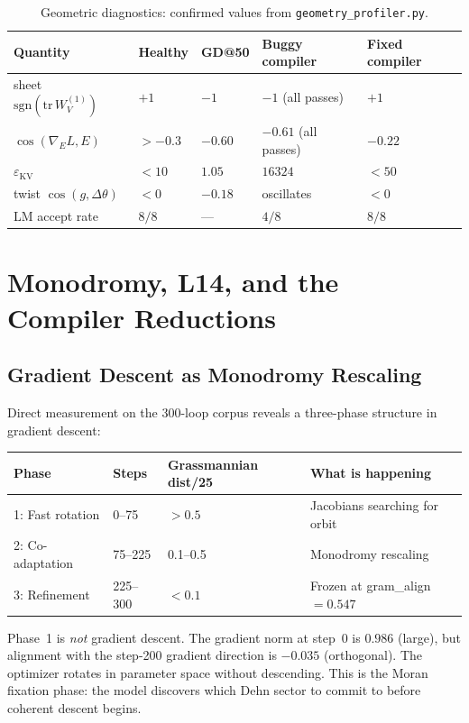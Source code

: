 \documentclass[11pt]{amsart}
\begin{document}
\begin{table}[htbp]
\centering\small
\caption{Geometric diagnostics: confirmed values from
  \texttt{geometry\_profiler.py}.}
\label{tab:debug}
\begin{tabular}{lllll}
\toprule
\textbf{Quantity} & \textbf{Healthy} & \textbf{GD@50}
  & \textbf{Buggy compiler} & \textbf{Fixed compiler} \\
\midrule
sheet $\mathrm{sgn}(\mathrm{tr}\,W_V^{(1)})$
  & $+1$ & $-1$ & $-1$ (all passes) & $+1$ \\
$\cos(\nabla_E L, E)$
  & $>-0.3$ & $-0.60$ & $-0.61$ (all passes) & $-0.22$ \\
$\varepsilon_\mathrm{KV}$
  & $<10$ & $1.05$ & $16324$ & $<50$ \\
twist $\cos(g,\Delta\theta)$
  & $<0$ & $-0.18$ & oscillates & $<0$ \\
LM accept rate & $8/8$ & --- & $4/8$ & $8/8$ \\
\bottomrule
\end{tabular}
\end{table}


\section{Monodromy, L14, and the Compiler Reductions}
\label{sec:monodromy}

\subsection{Gradient Descent as Monodromy Rescaling}

Direct measurement on the 300-loop corpus reveals a three-phase
structure in gradient descent:

\begin{center}\small
\begin{tabular}{llll}
\toprule
Phase & Steps & Grassmannian dist/25 & What is happening \\
\midrule
1: Fast rotation & 0--75 & $>0.5$ & Jacobians searching for orbit \\
2: Co-adaptation & 75--225 & 0.1--0.5 & Monodromy rescaling \\
3: Refinement & 225--300 & $<0.1$ & Frozen at gram\_align$=0.547$ \\
\bottomrule
\end{tabular}
\end{center}

Phase~1 is \emph{not} gradient descent.
The gradient norm at step~0 is $0.986$ (large), but alignment
with the step-200 gradient direction is $-0.035$ (orthogonal).
The optimizer rotates in parameter space without descending.
This is the Moran fixation phase: the model discovers which
Dehn sector to commit to before coherent descent begins.
\end{document}
